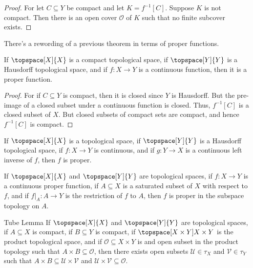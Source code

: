     \begin{proof}
        For let $C\subseteq{Y}$ be compact and let $K=f^{\minus{1}}[C]$.
        Suppose $K$ is not compact. Then there is an open cover
        $\mathcal{O}$ of $K$ such that no finite subcover exists.
    \end{proof}
    There's a rewording of a previous theorem in terms of proper functions.
    \begin{theorem}
        If $\topspace[X]{X}$ is a compact topological space, if
        $\topspace[Y]{Y}$ is a Hausdorff topological space, and if
        $f:X\rightarrow{Y}$ is a continuous function, then it is a proper
        function.
    \end{theorem}
    \begin{proof}
        For if $C\subseteq{Y}$ is compact, then it is closed since $Y$ is
        Hausdorff. But the pre-image of a closed subset under a continuous
        function is closed. Thus, $f^{\minus{1}}[C]$ is a closed subset of
        $X$. But closed subsets of compact sets are compact, and hence
        $f^{\minus{1}}[C]$ is compact.
    \end{proof}
    \begin{theorem}
        If $\topspace[X]{X}$ is a topological space, if $\topspace[Y]{Y}$
        is a Hausdorff topological space, if $f:X\rightarrow{Y}$ is
        continuous, and if $g:Y\rightarrow{X}$ is a continuous left inverse
        of $f$, then $f$ is proper.
    \end{theorem}
    \begin{theorem}
        If $\topspace[X]{X}$ and $\topspace[Y]{Y}$ are topological spaces,
        if $f:X\rightarrow{Y}$ is a continuous proper function, if
        $A\subseteq{X}$ is a saturated subset of $X$ with respect to $f$,
        and if $f|_{A}:A\rightarrow{Y}$ is the restriction of $f$ to $A$,
        then $f$ is proper in the subspace topology on $A$.
    \end{theorem}
    \begin{ltheorem}{Tube Lemma}
        If $\topspace[X]{X}$ and $\topspace[Y]{Y}$ are topological spaces,
        if $A\subseteq{X}$ is compact, if $B\subseteq{Y}$ is compact,
        if $\topspace[X\times{Y}]{X\times{Y}}$ is the product topological
        space, and if $\mathscr{O}\subseteq{X}\times{Y}$ is and open subset
        in the product topology such that $A\times{B}\subseteq\mathscr{O}$,
        then there exists open subsets $\mathcal{U}\in\tau_{X}$ and
        $\mathcal{V}\in\tau_{Y}$ such that
        $A\times{B}\subseteq\mathcal{U}\times\mathcal{V}$ and
        $\mathcal{U}\times\mathcal{V}\subseteq\mathscr{O}$.
    \end{ltheorem}
